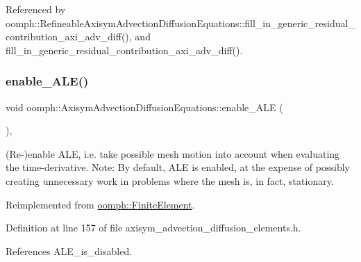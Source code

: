 Referenced by oomph\+::\+Refineable\+Axisym\+Advection\+Diffusion\+Equations\+::fill\+\_\+in\+\_\+generic\+\_\+residual\+\_\+contribution\+\_\+axi\+\_\+adv\+\_\+diff(), and fill\+\_\+in\+\_\+generic\+\_\+residual\+\_\+contribution\+\_\+axi\+\_\+adv\+\_\+diff().

\mbox{\label{classoomph_1_1AxisymAdvectionDiffusionEquations_aed501802a434d3143650fe2215660bd5}} 
\subsubsection{\texorpdfstring{enable\+\_\+\+A\+L\+E()}{enable\_ALE()}}
{\footnotesize\ttfamily void oomph\+::\+Axisym\+Advection\+Diffusion\+Equations\+::enable\+\_\+\+A\+LE (\begin{DoxyParamCaption}{ }\end{DoxyParamCaption})\hspace{0.3cm}{\ttfamily [inline]}, {\ttfamily [virtual]}}



(Re-\/)enable A\+LE, i.\+e. take possible mesh motion into account when evaluating the time-\/derivative. Note\+: By default, A\+LE is enabled, at the expense of possibly creating unnecessary work in problems where the mesh is, in fact, stationary. 



Reimplemented from \hyperlink{classoomph_1_1FiniteElement_a92ef8967fa4e2d6c33c51ea3efa3aa82}{oomph\+::\+Finite\+Element}.



Definition at line 157 of file axisym\+\_\+advection\+\_\+diffusion\+\_\+elements.\+h.



References A\+L\+E\+\_\+is\+\_\+disabled.

\mbox{\label{classoomph_1_1AxisymAdvectionDiffusionEquations_a4afbd032aca7d93c1e4402bd3ccc2379}} 
